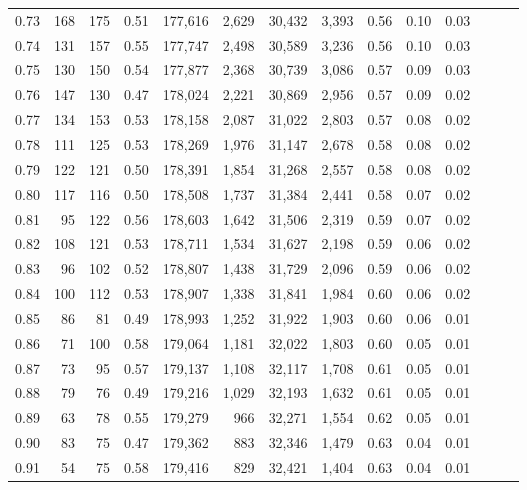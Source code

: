 \begin{tabular}{rrrrrrrrrrrrrr}
0.73 &    168 &  175 &  0.51 &  177,616 &    2,629 &  30,432 &   3,393 &  0.56 &  0.10 &      0.03 \\
0.74 &    131 &  157 &  0.55 &  177,747 &    2,498 &  30,589 &   3,236 &  0.56 &  0.10 &      0.03 \\
0.75 &    130 &  150 &  0.54 &  177,877 &    2,368 &  30,739 &   3,086 &  0.57 &  0.09 &      0.03 \\
0.76 &    147 &  130 &  0.47 &  178,024 &    2,221 &  30,869 &   2,956 &  0.57 &  0.09 &      0.02 \\
0.77 &    134 &  153 &  0.53 &  178,158 &    2,087 &  31,022 &   2,803 &  0.57 &  0.08 &      0.02 \\
0.78 &    111 &  125 &  0.53 &  178,269 &    1,976 &  31,147 &   2,678 &  0.58 &  0.08 &      0.02 \\
0.79 &    122 &  121 &  0.50 &  178,391 &    1,854 &  31,268 &   2,557 &  0.58 &  0.08 &      0.02 \\
0.80 &    117 &  116 &  0.50 &  178,508 &    1,737 &  31,384 &   2,441 &  0.58 &  0.07 &      0.02 \\
0.81 &     95 &  122 &  0.56 &  178,603 &    1,642 &  31,506 &   2,319 &  0.59 &  0.07 &      0.02 \\
0.82 &    108 &  121 &  0.53 &  178,711 &    1,534 &  31,627 &   2,198 &  0.59 &  0.06 &      0.02 \\
0.83 &     96 &  102 &  0.52 &  178,807 &    1,438 &  31,729 &   2,096 &  0.59 &  0.06 &      0.02 \\
0.84 &    100 &  112 &  0.53 &  178,907 &    1,338 &  31,841 &   1,984 &  0.60 &  0.06 &      0.02 \\
0.85 &     86 &   81 &  0.49 &  178,993 &    1,252 &  31,922 &   1,903 &  0.60 &  0.06 &      0.01 \\
0.86 &     71 &  100 &  0.58 &  179,064 &    1,181 &  32,022 &   1,803 &  0.60 &  0.05 &      0.01 \\
0.87 &     73 &   95 &  0.57 &  179,137 &    1,108 &  32,117 &   1,708 &  0.61 &  0.05 &      0.01 \\
0.88 &     79 &   76 &  0.49 &  179,216 &    1,029 &  32,193 &   1,632 &  0.61 &  0.05 &      0.01 \\
0.89 &     63 &   78 &  0.55 &  179,279 &      966 &  32,271 &   1,554 &  0.62 &  0.05 &      0.01 \\
0.90 &     83 &   75 &  0.47 &  179,362 &      883 &  32,346 &   1,479 &  0.63 &  0.04 &      0.01 \\
0.91 &     54 &   75 &  0.58 &  179,416 &      829 &  32,421 &   1,404 &  0.63 &  0.04 &      0.01 \\

\end{tabular}
